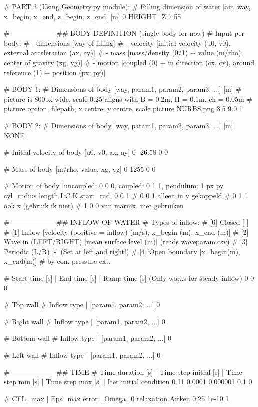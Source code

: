 # PART 3 (Using Geometry.py module):
# Filling dimension of water [air, way, x_begin, x_end, z_begin, z_end] [m]
0 HEIGHT_Z 7.55

#-------------------
## BODY DEFINITION (single body for now)
# Input per body:
# - dimensions      [way of filling]
# - velocity        [initial velocity (u0, v0), external acceleration (ax, ay)]
# - mass            [mass/density (0/1) + value (m/rho), center of gravity (xg, yg)]
# - motion          [coupled (0) + in direction (cx, cy), around reference (1) + position (px, py)]

# BODY 1:
# Dimensions of body [way, param1, param2, param3, ...] [m]
# picture is 800px wide, scale 0.25 aligns with B = 0.2m, H = 0.1m, ch = 0.05m
# picture option, filepath, x centre, y centre, scale
picture NURBS.png 8.5 9.0 1

# BODY 2:
# Dimensions of body [way, param1, param2, param3, ...] [m]
NONE

# Initial velocity of body [u0, v0, ax, ay]
0 -26.58 0 0

# Mass of body [m/rho, value, xg, yg]
0 1255 0 0

# Motion of body [uncoupled: 0 0 0, coupled: 0 1 1, pendulum: 1 px py cyl_radius length I C K start_rad]
0 0 1
# 0 0 1 alleen in y gekoppeld
# 0 1 1 ook x (gebruik ik niet)
# 1 0 0 van marnix, niet gebruiken

#-------------------
## INFLOW OF WATER
# Types of inflow:
# [0] Closed                [-]
# [1] Inflow                [velocity (positive = inflow) (m/s), x_begin (m), x_end (m)]
# [2] Wave in (LEFT/RIGHT)  [mean surface level (m)] (reads waveparam.csv)
# [3] Periodic (L/R)        [-] (Set at left and right!)
# [4] Open boundary         [x_begin(m), x_end(m)]
#     by con. pressure ext.

# Start time [s] | End time [s] | Ramp time [s] (Only works for steady inflow)
0 0 0

# Top wall
# Inflow type | [param1, param2, ...]
0

# Right wall
# Inflow type | [param1, param2, ...]
0

# Bottom wall
# Inflow type | [param1, param2, ...]
0

# Left wall
# Inflow type | [param1, param2, ...]
0

#-------------------
## TIME
# Time duration [s]	| Time step initial [s]		| Time step min [s]	| Time step max [s] | Iter initial condition
0.11 0.0001 0.000001 0.1 0

# CFL_max | Eps_max error | Omega_0 relaxation Aitken
0.25		1e-10	        1


